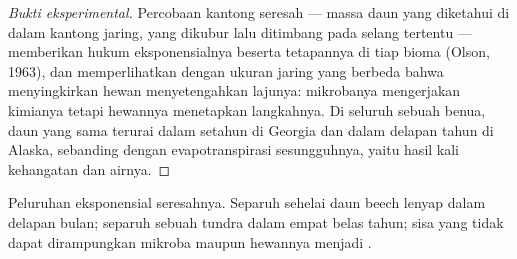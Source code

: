 \begin{proof}[Bukti eksperimental]
Percobaan kantong seresah --- massa daun yang diketahui di dalam
kantong jaring, yang dikubur lalu ditimbang pada selang tertentu ---
memberikan hukum eksponensialnya beserta tetapannya di tiap bioma
(Olson, 1963), dan memperlihatkan dengan ukuran jaring yang berbeda
bahwa menyingkirkan hewan  menyetengahkan lajunya: mikrobanya
mengerjakan kimianya tetapi hewannya menetapkan langkahnya. Di seluruh
sebuah benua, daun yang sama terurai dalam setahun di Georgia dan dalam
delapan tahun di Alaska, sebanding dengan evapotranspirasi
sesungguhnya, yaitu hasil kali kehangatan dan airnya.
\end{proof}

\begin{omfigure}

{\small Peluruhan eksponensial seresahnya. Separuh sehelai daun beech
lenyap dalam delapan bulan; separuh sebuah  tundra dalam empat
belas tahun; sisa yang tidak dapat dirampungkan mikroba maupun hewannya
menjadi .}
\end{omfigure}

